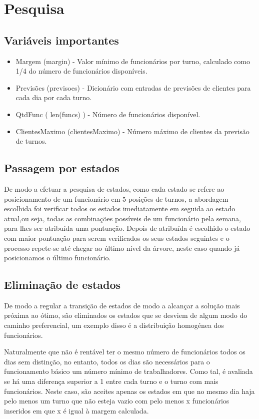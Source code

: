 \section{Pesquisa}

\subsection*{\bf Variáveis importantes}
\begin{itemize}
    \item Margem (margin) - Valor mínimo de funcionários por turno, calculado como 1/4 do número de funcionários disponíveis.
    \item Previsões (previsoes) - Dicionário com entradas de previsões de clientes para cada dia por cada turno.
    \item QtdFunc ( len(funcs) ) - Número de funcionários disponível.
    \item ClientesMaximo (clientesMaximo) - Número máximo de clientes da previsão de turnos.
\end{itemize}
\bigskip

\subsection*{\bf Passagem por estados}

De modo a efetuar a pesquisa de estados, como cada estado se refere ao posicionamento de um funcionário em 5 posições de turnos, a abordagem escolhida foi verificar todos os estados imediatamente em seguida ao estado atual,ou seja, todas as combinações possíveis de um funcionário pela semana, para lhes ser atribuída uma pontuação. Depois de atribuída é escolhido o estado com maior pontuação para serem verificados os seus estados seguintes e o processo repete-se até chegar ao último nível da árvore, neste caso quando já posicionamos o último funcionário.
\bigskip

\subsection*{\bf Eliminação de estados}

De modo a regular a transição de estados de modo a alcançar a solução mais próxima ao ótimo, são eliminados os estados que se desviem de algum modo do caminho preferencial, um exemplo disso é a distribuição homogénea dos funcionários.
\bigskip

Naturalmente que não é rentável ter o mesmo número de funcionários todos os dias sem distinção, no entanto, todos os dias são necessários para o funcionamento básico um número mínimo de trabalhadores. Como tal, é avaliada se há uma diferença superior a 1 entre cada turno e o turno com mais funcionários. Neste caso, são aceites apenas os estados em que no mesmo dia haja pelo menos um turno que não esteja vazio com pelo menos x funcionários inseridos em que x é igual à margem calculada.

